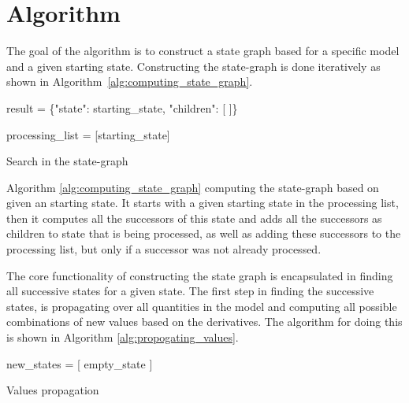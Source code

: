 \documentclass[a4paper]{article}
\begin{document}
\newpage
\section{Algorithm}
The goal of the algorithm is to construct a state graph based for a specific model and a given starting state. Constructing the state-graph is done iteratively as shown in Algorithm~\ref{alg:computing_state_graph}.

\vspace{12pt}
\begin{algorithm}[H]
    result = \{"state": starting\_state, "children": [ ]\}

    processing\_list = [starting\_state]

\caption{Search in the state-graph}
\label{alg:computing_state_graph}
\end{algorithm}
\vspace{12pt}

Algorithm \ref{alg:computing_state_graph} computing the state-graph based on given an starting state. It starts with a given starting state in the processing list, then it computes all the successors of this state and adds all the successors as children to state that is being processed, as well as adding these successors to the processing list, but only if a successor was not already processed.

The core functionality of constructing the state graph is encapsulated in finding all successive states for a given state. The first step in finding the successive states, is propagating over all quantities in the model and computing all possible combinations of new values based on the derivatives. The algorithm for doing this is shown in Algorithm \ref{alg:propogating_values}.

\vspace{12pt}
\begin{algorithm}[H]
new\_states = [ empty\_state ]

\caption{Values propagation}
\label{alg:propogating_values}
\end{algorithm}
\vspace{12pt}
\end{document}
